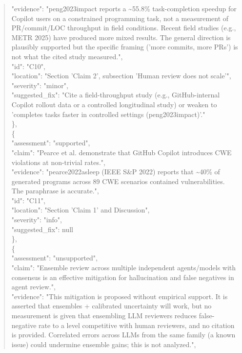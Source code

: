\documentclass[11pt]{article}
\begin{document}
\begin{quote}
      "evidence": "peng2023impact reports a \~{}55.8\% task-completion speedup for Copilot users on a constrained programming task, not a measurement of PR/commit/LOC throughput in field conditions. Recent field studies (e.g., METR 2025) have produced more mixed results. The general direction is plausibly supported but the specific framing ('more commits, more PRs') is not what the cited study measured.",\\
      "id": "C10",\\
      "location": "Section 'Claim 2', subsection 'Human review does not scale'",\\
      "severity": "minor",\\
      "suggested\_fix": "Cite a field-throughput study (e.g., GitHub-internal Copilot rollout data or a controlled longitudinal study) or weaken to 'completes tasks faster in controlled settings (peng2023impact)'."\\
    \},\\
    \{\\
      "assessment": "supported",\\
      "claim": "Pearce et al. demonstrate that GitHub Copilot introduces CWE violations at non-trivial rates.",\\
      "evidence": "pearce2022asleep (IEEE S\&P 2022) reports that \~{}40\% of generated programs across 89 CWE scenarios contained vulnerabilities. The paraphrase is accurate.",\\
      "id": "C11",\\
      "location": "Section 'Claim 1' and Discussion",\\
      "severity": "info",\\
      "suggested\_fix": null\\
    \},\\
    \{\\
      "assessment": "unsupported",\\
      "claim": "Ensemble review across multiple independent agents/models with consensus is an effective mitigation for hallucination and false negatives in agent review.",\\
      "evidence": "This mitigation is proposed without empirical support. It is asserted that ensembles + calibrated uncertainty will work, but no measurement is given that ensembling LLM reviewers reduces false-negative rate to a level competitive with human reviewers, and no citation is provided. Correlated errors across LLMs from the same family (a known issue) could undermine ensemble gains; this is not analyzed.",\\

\end{quote}
\end{document}
